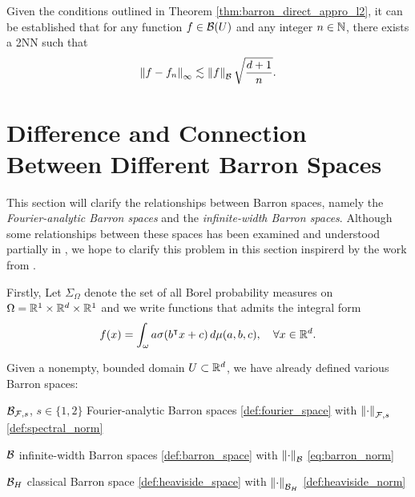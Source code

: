 
\begin{theorem}
    Given the conditions outlined in Theorem \ref{thm:barron_direct_appro_l2},
    it can be established that for any function $f \in \mathcal{B}(U)$ and any
    integer $n \in \mathbb{N}$, there exists a 2NN such that
    \begin{equation}
        \left\| f - f_n \right\|_{\infty} \lesssim 
        \left\| f \right\|_{\mathcal{B}} \sqrt{\frac{d+1}{n}}.
    \end{equation}
\end{theorem}


\section{Difference and Connection Between Different Barron Spaces}
\label{sec:diff_barron_spaces}

This section will clarify the relationships between  Barron spaces, namely the
\textit{Fourier-analytic Barron spaces} and the \textit{infinite-width Barron
spaces}. Although some relationships between these spaces has been examined and
understood partially in
\cite{eBarronSpaceFlowinduced2021,eMathematicalUnderstandingNeural2020}, we hope
to clarify this problem in this section inspirerd by the work from
\cite{carageaNeuralNetworkApproximation2022}.

Firstly, Let $\Sigma_{\Omega}$ denote the set of all Borel probability
measures on $\Omega = \mathbb{R}^1 \times \mathbb{R}^d \times \mathbb{R}^1$ and we write functions that
admits the integral form
\begin{equation}
    \label{eq:integral_represent}
    f(x) = \int_{\omega} a\sigma(b{}^{\intercal} x + c) \,d\mu(a,b,c), \quad
    \forall x \in \mathbb{R}^d.
\end{equation}

Given a nonempty, bounded domain $U \subset \mathbb{R}^d$, we have already defined
various Barron spaces:

\begin{itemize}
    \item $\mathcal{B}_{\mathcal{F}, s}$, $s \in \{1,2\}$ Fourier-analytic Barron spaces 
        \eqref{def:fourier_space} with $\left\| \cdot \right\|_{\mathcal{F},s}$ 
        \eqref{def:spectral_norm}
    \item $\mathcal{B}$ infinite-width Barron spaces \eqref{def:barron_space} with
        $\left\| \cdot \right\|_{\mathcal{B}}$ \eqref{eq:barron_norm}
    {
        \setlength\itemindent{25pt}
        \item $\mathcal{B}_{H}$ classical Barron space \eqref{def:heaviside_space}
            with $\left\| \cdot \right\|_{\mathcal{B}_H}$ \eqref{def:heaviside_norm}
    }
\end{itemize}

